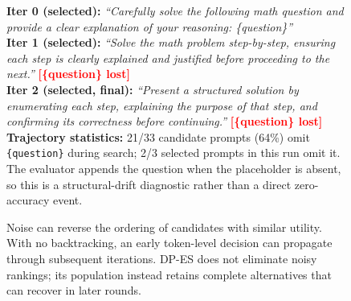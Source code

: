 
\begin{figure}[!t]
\begingroup
\setlength{\textfloatsep}{4pt plus 1pt minus 1pt}
\setlength{\floatsep}{4pt plus 1pt minus 1pt}
\setlength{\intextsep}{4pt plus 1pt minus 1pt}
\captionsetup{font=footnotesize,skip=2pt}
\centering
\vspace{-0.4em}

\begin{tcolorbox}[
    width=0.96\textwidth,
    colback=red!5!white,
    colframe=red!75!black,
    title={\textbf{DP-OPT: Template Drift in the Search Trajectory (GSM8K, real log)}},
    fonttitle=\bfseries,
    sharp corners,
    boxrule=0.4pt,
    before skip=0pt,
    after skip=0pt,
    top=1mm,
    bottom=1mm,
]
\footnotesize
\textbf{Iter 0 (selected):} \textit{``Carefully solve the following math question and provide a clear explanation of your reasoning: \textcolor{green!50!black}{\{question\}}''} \\
\textbf{Iter 1 (selected):} \textit{``Solve the math problem step-by-step, ensuring each step is clearly explained and justified before proceeding to the next.''} \quad \textcolor{red}{\textbf{[\{question\} lost]}} \\
\textbf{Iter 2 (selected, final):} \textit{``Present a structured solution by enumerating each step, explaining the purpose of that step, and confirming its correctness before continuing.''} \quad \textcolor{red}{\textbf{[\{question\} lost]}} \\[0.3em]
\textbf{Trajectory statistics:} 21/33 candidate prompts (64\%) omit \texttt{\{question\}} during search; 2/3 selected prompts in this run omit it. The evaluator appends the question when the placeholder is absent, so this is a structural-drift diagnostic rather than a direct zero-accuracy event.
\end{tcolorbox}

\vspace{0.3em}

\begin{tcolorbox}[
    width=0.96\textwidth,
    colback=orange!5!white,
    colframe=orange!75!black,
    title={\textbf{DP-OPT: Noise-Driven Suboptimal Selection}},
    fonttitle=\bfseries,
    sharp corners,
    boxrule=0.4pt,
    before skip=0pt,
    after skip=0pt,
    top=1mm,
    bottom=1mm,
]
\footnotesize
Noise can reverse the ordering of candidates with similar utility. With no backtracking, an early token-level decision can propagate through subsequent iterations. DP-ES does not eliminate noisy rankings; its population instead retains complete alternatives that can recover in later rounds.
\end{tcolorbox}


\end{figure}
